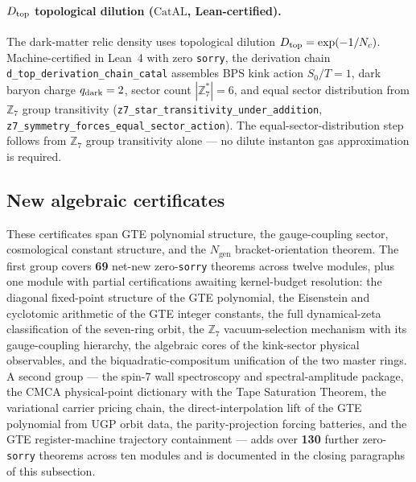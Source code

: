 \documentclass[11pt,a4paper]{article}
\theoremstyle{definition}
\newcommand{\CatAL}{\ensuremath{\mathrm{CatAL}}}
\begin{document}
\paragraph{$D_{\rm top}$ topological dilution (\CatAL, Lean-certified).}
The dark-matter relic density uses topological dilution
$D_{\rm top}=\exp(-1/N_c)$.
Machine-certified in Lean~4 with zero \texttt{sorry}, the derivation chain
\texttt{d\_top\_derivation\_chain\_catal} assembles BPS kink action $S_0/T=1$,
dark baryon charge $q_{\rm dark}=2$, sector count $|\mathbb{Z}_7^*|=6$, and
equal sector distribution from $\mathbb{Z}_7$ group transitivity
(\texttt{z7\_star\_transitivity\_under\_addition},
\texttt{z7\_symmetry\_forces\_equal\_sector\_action}).
The equal-sector-distribution step follows from $\mathbb{Z}_7$ group transitivity
alone --- no dilute instanton gas approximation is required.

\subsection{New algebraic certificates}\label{subsec:new-algebraic-certificates}

These certificates span GTE polynomial structure, the gauge-coupling sector,
cosmological constant structure, and the $N_{\mathrm{gen}}$
bracket-orientation theorem.
The first group covers \textbf{69} net-new zero-\texttt{sorry} theorems across twelve
modules, plus one module with partial certifications awaiting kernel-budget
resolution: the diagonal fixed-point structure of the GTE polynomial,
the Eisenstein and cyclotomic arithmetic of the GTE integer constants, the full
dynamical-zeta classification of the seven-ring orbit, the $\mathbb{Z}_7$
vacuum-selection mechanism with its gauge-coupling hierarchy, the algebraic
cores of the kink-sector physical observables, and the biquadratic-compositum
unification of the two master rings.
A second group --- the spin-7 wall spectroscopy and spectral-amplitude package,
the CMCA physical-point dictionary with the Tape Saturation Theorem, the
variational carrier pricing chain, the direct-interpolation lift of the GTE
polynomial from UGP orbit data, the parity-projection forcing batteries, and
the GTE register-machine trajectory containment --- adds over
\textbf{130} further zero-\texttt{sorry} theorems across ten modules and is
documented in the closing paragraphs of this subsection.
\end{document}
